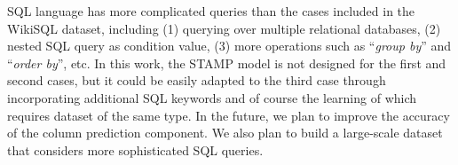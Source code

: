\documentclass[11pt,a4paper]{article}
\begin{document}
SQL language has more complicated queries than the cases included in the WikiSQL dataset, including (1) querying over multiple relational databases, (2) nested SQL query as condition value, (3) more operations such as ``\textit{group by}'' and ``\textit{order by}'', etc.
In this work, the STAMP model is not designed for the first and second cases, but it could be easily adapted to the third case through incorporating additional SQL keywords and of course the learning of which requires dataset of the same type.
In the future, we plan to improve the accuracy of the column prediction \mbox{component}.
We also plan to build a large-scale dataset that considers more sophisticated SQL queries.




\appendix



	
\end{document}
